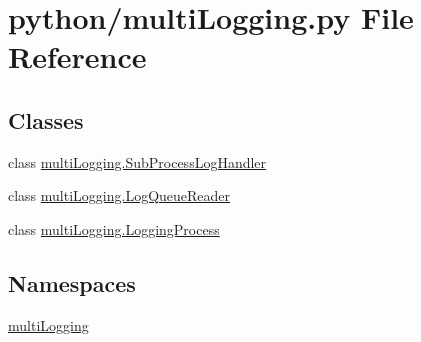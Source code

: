 \section{python/multi\-Logging.py File Reference}
\label{multiLogging_8py}
\subsection*{Classes}
\begin{DoxyCompactItemize}
\item 
class \hyperlink{classmultiLogging_1_1SubProcessLogHandler}{multi\-Logging.\-Sub\-Process\-Log\-Handler}
\item 
class \hyperlink{classmultiLogging_1_1LogQueueReader}{multi\-Logging.\-Log\-Queue\-Reader}
\item 
class \hyperlink{classmultiLogging_1_1LoggingProcess}{multi\-Logging.\-Logging\-Process}
\end{DoxyCompactItemize}
\subsection*{Namespaces}
\begin{DoxyCompactItemize}
\item 
\hyperlink{namespacemultiLogging}{multi\-Logging}
\end{DoxyCompactItemize}
